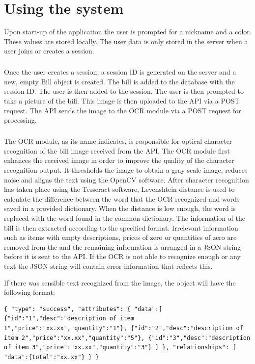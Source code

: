 \documentclass[12pt,a4paper]{article}
\begin{document}
\section{Using the system}
Upon start-up of the application the user is prompted for a nickname and a color. These values are stored locally. The user data is only stored in the server when a user joins or creates a session.  
\subparagraph{}
Once the user creates a session, a session ID is generated on the server and a new, empty Bill object is created. The bill is added to the database with the session ID. The user is then added to the session. The user is then prompted to take a picture of the bill. This image is then uploaded to the API via a POST request. The API sends the image to the OCR module via a POST request for processing. 
\subparagraph{}
The OCR module, as its name indicates, is responsible for optical character recognition of the bill image received from the API. The OCR module first enhances the received image in order to improve the quality of the character recognition output. It thresholds the image to obtain a gray-scale image, reduces noise and aligns the text using the OpenCV software. After character recognition has taken place using the Tesseract software, Levenshtein distance is used to calculate the difference between the word that the OCR recognized and words saved in a provided dictionary. When the distance is low enough, the word is replaced with the word found in the common dictionary. The information of the bill is then extracted according to the specified format. Irrelevant information such as items with empty descriptions, prices of zero or quantities of zero are removed from the and the remaining information is arranged in a JSON string before it is sent to the API. If the OCR is not able to recognize enough or any text the JSON string will contain error information that reflects this. 
\hspace{1cm}

If there was sensible text recognized from the image, the object will have the following format:

\begin{lstlisting}
{ "type": "success", "attributes": { "data":[ {"id":"1","desc":"description of item 1","price":"xx.xx","quantity":"1"}, {"id":"2","desc":"description of item 2","price":"xx.xx","quantity":"5"}, {"id":"3","desc":"description of item 3","price":"xx.xx","quantity":"3"} ] }, "relationships": { "data":{total":"xx.xx"} } }
\end{lstlisting}
\end{document}
